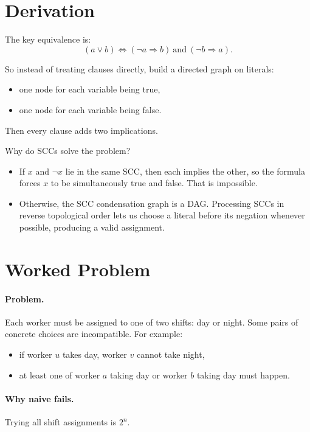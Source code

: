 \section*{Derivation}

The key equivalence is:
\[
(a \lor b) \iff (\lnot a \Rightarrow b)\ \text{and}\ (\lnot b \Rightarrow a).
\]

So instead of treating clauses directly, build a directed graph on literals:

\begin{itemize}
  \item one node for each variable being true,
  \item one node for each variable being false.
\end{itemize}

Then every clause adds two implications.

Why do SCCs solve the problem?

\begin{itemize}
  \item If \(x\) and \(\lnot x\) lie in the same SCC, then each implies the other, so the formula forces \(x\) to be
  simultaneously true and false. That is impossible.
  \item Otherwise, the SCC condensation graph is a DAG. Processing SCCs in reverse topological order lets us choose a
  literal before its negation whenever possible, producing a valid assignment.
\end{itemize}

\section*{Worked Problem}

\paragraph{Problem.}
Each worker must be assigned to one of two shifts: day or night. Some pairs of concrete choices are incompatible. For
example:

\begin{itemize}
  \item if worker \(u\) takes day, worker \(v\) cannot take night,
  \item at least one of worker \(a\) taking day or worker \(b\) taking day must happen.
\end{itemize}

\paragraph{Why naive fails.}
Trying all shift assignments is \(2^n\).

